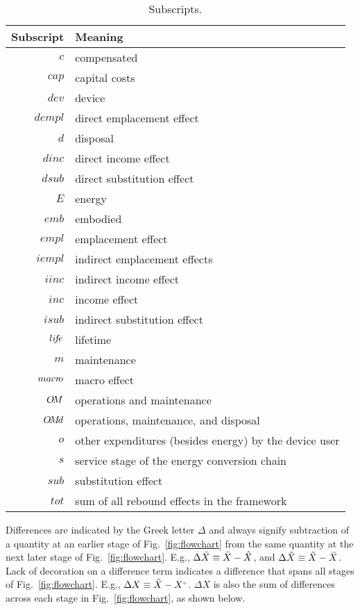 
\begin{table}
\footnotesize
\centering
\caption{Subscripts.}
\begin{tabular}{r l}
  \toprule
  Subscript & Meaning \\
  \midrule
  $c$      & compensated \\
  $cap$    & capital costs \\
  $dev$    & device \\
  $dempl$  & direct emplacement effect \\
  $d$      & disposal \\
  $dinc$   & direct income effect \\
  $dsub$   & direct substitution effect \\
  $E$      & energy \\
  $emb$    & embodied \\
  $empl$   & emplacement effect \\
  $iempl$  & indirect emplacement effects \\
  $iinc$   & indirect income effect \\
  $inc$    & income effect \\
  $isub$   & indirect substitution effect \\
  $li\!f\!e$  & lifetime \\
  $m$      & maintenance \\
  $macr\!o$ & macro effect \\
  $O\!M$    & operations and maintenance \\
  $O\!M\!d$   & operations, maintenance, and disposal \\
  $o$      & other expenditures (besides energy) by the device user \\
  $s$      & service stage of the energy conversion chain \\
  $sub$    & substitution effect \\
  $tot$    & sum of all rebound effects in the framework \\
  \bottomrule
\end{tabular}
\label{tab:subscripts}
\end{table}


Differences are indicated by the Greek letter $\Delta$ and always
signify subtraction of a quantity at an earlier stage of Fig.~\ref{fig:flowchart}
from the same quantity at the next later stage of Fig.~\ref{fig:flowchart}.
E.g.,
$\Delta \bar{X} \equiv \bar{X} - \hat{X}$, and
$\Delta \tilde{X} \equiv \tilde{X} - \bar{X}$.
Lack of decoration on a difference term indicates a difference that spans all stages of Fig.~\ref{fig:flowchart}.
E.g., $\Delta X \equiv \tilde{X} - {}{X}^{\scriptscriptstyle \circ}$.
$\Delta X$ is also the sum of differences across each stage in Fig.~\ref{fig:flowchart},
as shown below.

